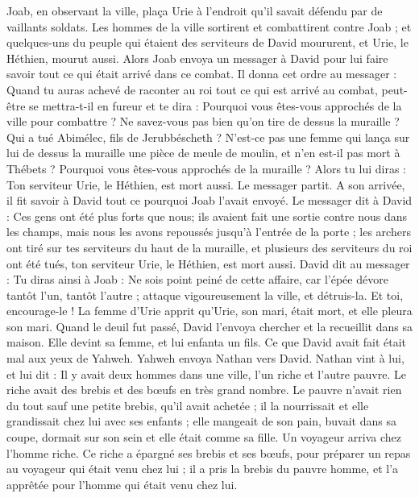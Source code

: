 \begin{multicols}{2}
Joab, en observant la ville, plaça Urie à l’endroit qu'il savait défendu par de vaillants soldats.
Les hommes de la ville sortirent et combattirent contre Joab ; et quelques-uns du peuple qui étaient des serviteurs de David moururent, et Urie, le Héthien, mourut aussi.
Alors Joab envoya un messager à David pour lui faire savoir tout ce qui était arrivé dans ce combat.
Il donna cet ordre au messager : Quand tu auras achevé de raconter au roi tout ce qui est arrivé au combat, peut-être se mettra-t-il en fureur et te dira : Pourquoi vous êtes-vous approchés de la ville pour combattre ? Ne savez-vous pas bien qu'on tire de dessus la muraille ?
Qui a tué Abimélec, fils de Jerubbéscheth ? N’est-ce pas une femme qui lança sur lui de dessus la muraille une pièce de meule de moulin, et n’en est-il pas mort à Thébets ? Pourquoi vous êtes-vous approchés de la muraille ? Alors tu lui diras : Ton serviteur Urie, le Héthien, est mort aussi.
Le messager partit. A son arrivée, il fit savoir à David tout ce pourquoi Joab l'avait envoyé.
Le messager dit à David : Ces gens ont été plus forts que nous; ils avaient fait une sortie contre nous dans les champs, mais nous les avons repoussés jusqu'à l'entrée de la porte ;
les archers ont tiré sur tes serviteurs du haut de la muraille, et plusieurs des serviteurs du roi ont été tués, ton serviteur Urie, le Héthien, est mort aussi.
David dit au messager : Tu diras ainsi à Joab : Ne sois point peiné de cette affaire, car l'épée dévore tantôt l'un, tantôt l'autre ; attaque vigoureusement la ville, et détruis-la. Et toi, encourage-le !
La femme d'Urie apprit qu'Urie, son mari, était mort, et elle pleura son mari.
Quand le deuil fut passé, David l’envoya chercher et la recueillit dans sa maison. Elle devint sa femme, et lui enfanta un fils. Ce que David avait fait était mal aux yeux de Yahweh.
\VerseOne{}Yahweh envoya Nathan vers David. Nathan vint à lui, et lui dit : Il y avait deux hommes dans une ville, l'un riche et l'autre pauvre.
Le riche avait des brebis et des bœufs en très grand nombre.
Le pauvre n'avait rien du tout sauf une petite brebis, qu'il avait achetée ; il la nourrissait et elle grandissait chez lui avec ses enfants ; elle mangeait de son pain, buvait dans sa coupe, dormait sur son sein et elle était comme sa fille.
Un voyageur arriva chez l’homme riche. Ce riche a épargné ses brebis et ses bœufs, pour préparer un repas au voyageur qui était venu chez lui ; il a pris la brebis du pauvre homme, et l’a apprêtée pour l’homme qui était venu chez lui.

\end{multicols}
